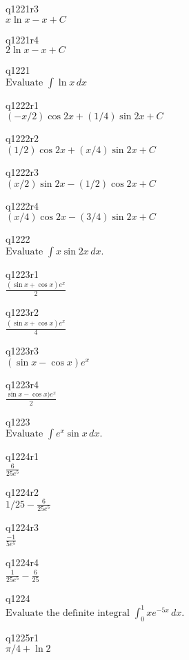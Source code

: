 q1221r3\\
\(\displaystyle x \ln x - x + C \)

q1221r4\\
\(\displaystyle 2\ln x - x + C \)

q1221\\
\(\displaystyle \text{Evaluate } \int \ln x\,dx \)

q1222r1\\
\(\displaystyle (-x/2)\cos 2x + (1/4) \sin 2x + C \)

q1222r2\\
\(\displaystyle (1/2) \cos 2x + (x/4)\sin 2x + C \)

q1222r3\\
\(\displaystyle (x/2)\sin 2x  - (1/2)\cos 2x + C \)

q1222r4\\
\(\displaystyle (x/4)\cos 2x - (3/4) \sin 2x + C \)

q1222\\
\(\displaystyle \text{Evaluate } \int x \sin 2x \, dx. \)

q1223r1\\
\(\displaystyle \frac{ (\sin x + \cos x)e^x}{2} \)

q1223r2\\
\(\displaystyle \frac{(\sin x + \cos x)e^x}{4} \)

q1223r3\\
\(\displaystyle (\sin x - \cos x)e^x \)

q1223r4\\
\(\displaystyle \frac{\sin x - \cos x)e^x}{2} \)

q1223\\
\(\displaystyle \text{Evaluate } \int e^x \sin x \, dx. \)

q1224r1\\
\(\displaystyle \frac{6}{25e^5} \)

q1224r2\\
\(\displaystyle 1/25 - \frac{6}{25e^5} \)

q1224r3\\
\(\displaystyle \frac{-1}{5e^5} \)

q1224r4\\
\(\displaystyle \frac{1}{25e^5} - \frac{6}{25} \)

q1224\\
\(\displaystyle \text{Evaluate the definite integral } \int_0^1 xe^{-5x} \, dx. \)

q1225r1\\
\(\displaystyle \pi/4 + \ln 2 \)

